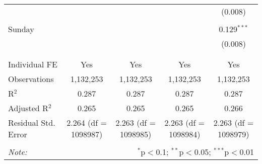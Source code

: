 \documentclass[
]{article}
\begin{document}
\begin{table}[!htbp]
{\begin{tabular}{@{\extracolsep{5pt}}lcccc}
  &  &  &  & (0.008) \\ 
  & & & & \\ 
 Sunday &  &  &  & 0.129$^{***}$ \\ 
  &  &  &  & (0.008) \\ 
  & & & & \\ 
\hline \\[-1.8ex] 
Individual FE & Yes & Yes & Yes & Yes \\ 
Observations & 1,132,253 & 1,132,253 & 1,132,253 & 1,132,253 \\ 
R$^{2}$ & 0.287 & 0.287 & 0.287 & 0.287 \\ 
Adjusted R$^{2}$ & 0.265 & 0.265 & 0.265 & 0.266 \\ 
Residual Std. Error & 2.264 (df = 1098987) & 2.263 (df = 1098985) & 2.263 (df = 1098984) & 2.263 (df = 1098979) \\ 
\hline 
\hline \\[-1.8ex] 
\textit{Note:}  & \multicolumn{4}{r}{$^{*}$p$<$0.1; $^{**}$p$<$0.05; $^{***}$p$<$0.01} \\ 
\end{tabular}
} 
\end{table} 
\newpage
\end{document}
